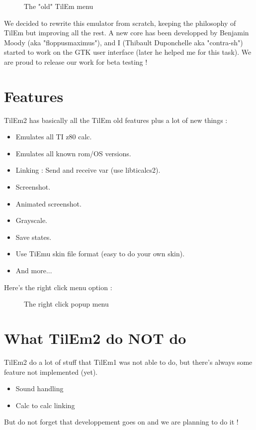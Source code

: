 \documentclass[10pt]{report}
\begin{document}
\begin{figure}[H]
\centering
{}
\caption{The "old" TilEm menu}
\end{figure}

We decided to rewrite this emulator from scratch, keeping the philosophy of TilEm but improving all the rest.\newline
A new core has been developped by Benjamin Moody (aka "floppusmaximus"), and I (Thibault Duponchelle aka "contra-sh") started to work on the GTK user interface (later he helped me for this task).\newline\newline
We are proud to release our work for beta testing !

\section{Features}
TilEm2 has basically all the TilEm old features plus a lot of new things :\newline
\begin{itemize}
\item   Emulates all TI z80 calc.
\item	Emulates all known rom/OS versions.
\item	Linking : Send and receive var (use libticalcs2). 
\item	Screenshot.
\item	Animated screenshot. 
\item	Grayscale. 
\item	Save states.
\item	Use TiEmu skin file format (easy to do your own skin).
\item	And more...
\end{itemize}

Here's the right click menu option :\newline
\begin{figure}[H]
\centering
{}
\caption{The right click popup menu}
\end{figure}


\section{What TilEm2 do NOT do}
TilEm2 do a lot of stuff that TilEm1 was not able to do, but there's always some feature not implemented (yet).\newline
\begin{itemize}
\item Sound handling
\item Calc to calc linking
\end{itemize}
But do not forget that developpement goes on and we are planning to do it !\newline
\end{document}
